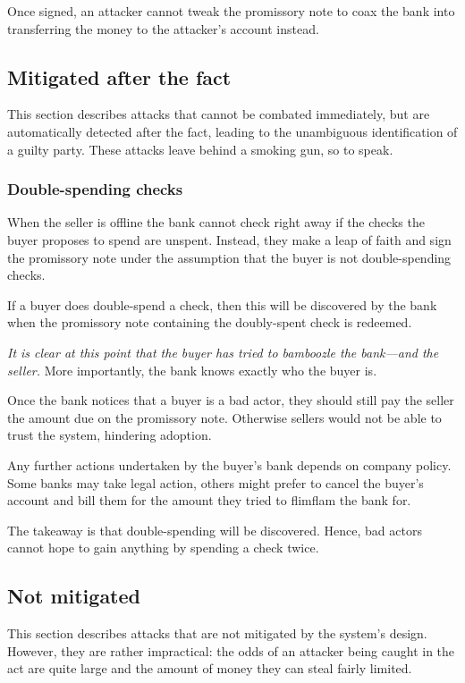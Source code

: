 \documentclass[12pt,a4paper]{article}
\begin{document}
\begin{multicols}{2}
	Once signed, an attacker cannot tweak the promissory note to coax the bank into transferring the money to the attacker's account instead.

	\subsection{Mitigated after the fact}

	This section describes attacks that cannot be combated immediately, but are automatically detected after the fact, leading to the unambiguous identification of a guilty party. These attacks leave behind a smoking gun, so to speak.

	\subsubsection{Double-spending checks}
	\label{sec:double-spending-checks}

	When the seller is offline the bank cannot check right away if the checks the buyer proposes to spend are unspent. Instead, they make a leap of faith and sign the promissory note under the assumption that the buyer is not double-spending checks.

	If a buyer does double-spend a check, then this will be discovered by the bank when the promissory note containing the doubly-spent check is redeemed.

	\emph{It is clear at this point that the buyer has tried to bamboozle the bank---and the seller.} More importantly, the bank knows exactly who the buyer is.

	Once the bank notices that a buyer is a bad actor, they should still pay the seller the amount due on the promissory note. Otherwise sellers would not be able to trust the system, hindering adoption.
	
	Any further actions undertaken by the buyer's bank depends on company policy. Some banks may take legal action, others might prefer to cancel the buyer's account and bill them for the amount they tried to flimflam the bank for.

	The takeaway is that double-spending will be discovered. Hence, bad actors cannot hope to gain anything by spending a check twice.

	\subsection{Not mitigated}
	
	This section describes attacks that are not mitigated by the system's design. However, they are rather impractical: the odds of an attacker being caught in the act are quite large and the amount of money they can steal fairly limited.


\end{multicols}
\end{document}
